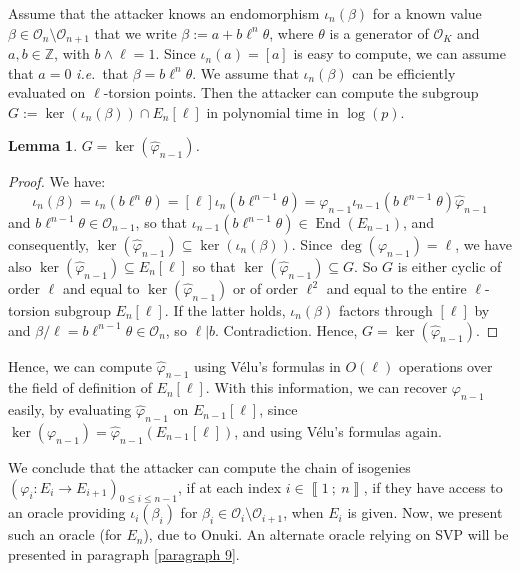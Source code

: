 \documentclass[a4paper,10pt]{report}
\theoremstyle{definition}
\theoremstyle{plain}
\newtheorem{Lemma}[Definition]{Lemma}
\theoremstyle{definition}
\newcommand{\ie}{\emph{i.e.}\ }
\newcommand{\Z}{\mathbb{Z}}
\newcommand{\mO}{\mathcal{O}}
\renewcommand{\i}[2]{\left\llbracket #1~;~#2\right\rrbracket}
\renewcommand{\(}{\left(}
\renewcommand{\)}{\right)}
\DeclareMathOperator{\End}{End}
\begin{document}
Assume that the attacker knows an endomorphism $\iota_n(\beta)$ for a known value $\beta\in\mO_n\setminus \mO_{n+1}$ that we write $\beta:=a+b\ell^n\theta$, where $\theta$ is a generator of $\mO_K$ and $a,b\in\Z$, with $b\wedge \ell=1$. Since $\iota_n(a)=[a]$ is easy to compute, we can assume that $a=0$ \ie that $\beta=b\ell^n\theta$. We assume that $\iota_n(\beta)$ can be efficiently evaluated on $\ell$-torsion points. Then the attacker can compute the subgroup $G:=\ker(\iota_n(\beta))\cap  E_n[\ell]$ in polynomial time in $\log(p)$. 

\begin{Lemma}
$G=\ker(\widehat{\varphi}_{n-1})$.
\end{Lemma}

\begin{proof}
We have:
\[\iota_n(\beta)=\iota_n(b\ell^n\theta)=[\ell]\iota_n(b\ell^{n-1}\theta)=\varphi_{n-1}\iota_{n-1}(b\ell^{n-1}\theta)\widehat{\varphi}_{n-1}\]
and $b\ell^{n-1}\theta\in\mO_{n-1}$, so that $\iota_{n-1}(b\ell^{n-1}\theta)\in\End(E_{n-1})$, and consequently, $\ker(\widehat{\varphi}_{n-1})\subseteq\ker(\iota_n(\beta))$. Since $\deg(\varphi_{n-1})=\ell$, we have also $\ker(\widehat{\varphi}_{n-1})\subseteq E_{n}[\ell]$ so that $\ker(\widehat{\varphi}_{n-1})\subseteq G$.  So $G$ is either cyclic of order $\ell$ and equal to $\ker(\widehat{\varphi}_{n-1})$ or of order $\ell^2$ and equal to the entire $\ell$-torsion subgroup $E_n[\ell]$. If the latter holds, $\iota_n(\beta)$ factors through $[\ell]$ by \cite[Corollary III.4.11]{Silverman1} and $\beta/\ell=b\ell^{n-1}\theta\in\mO_n$, so $\ell|b$. Contradiction. Hence, $G=\ker(\widehat{\varphi}_{n-1})$.
\end{proof}

Hence, we can compute $\widehat{\varphi}_{n-1}$ using V\'{e}lu's formulas in $O(\ell)$ operations over the field of definition of $E_n[\ell]$. With this information, we can recover $\varphi_{n-1}$ easily, by evaluating $\widehat{\varphi}_{n-1}$ on $E_{n-1}[\ell]$, since $\ker(\varphi_{n-1})=\widehat{\varphi}_{n-1}(E_{n-1}[\ell])$, and using V\'{e}lu's formulas again.

We conclude that the attacker can compute the chain of isogenies $(\varphi_i : E_i\longrightarrow E_{i+1})_{0\leq i\leq n-1}$, if at each index $i\in\i{1}{n}$,  if they have access to an oracle providing $\iota_i(\beta_i)$ for $\beta_i\in\mO_i\setminus\mO_{i+1}$, when $E_{i}$ is given. Now, we present such an oracle (for $E_n$), due to Onuki. An alternate oracle relying on SVP will be presented in paragraph \ref{paragraph 9}.
\end{document}
